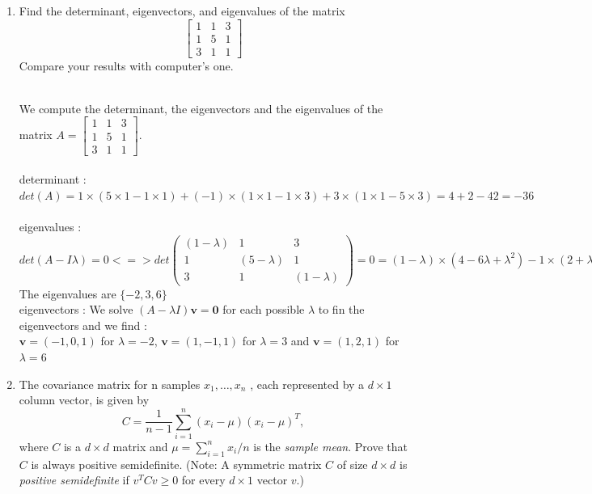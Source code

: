 \documentclass[a4paper]{article}
\begin{document}
\begin{enumerate}
    \item Find the determinant, eigenvectors, and eigenvalues of the matrix
    \[
    \begin{bmatrix}
        1 & 1 & 3 \\
        1 & 5 & 1 \\
        3 & 1 & 1
    \end{bmatrix}
    \]
    Compare your results with computer’s one.
    
    \hrulefill \\
    We compute the determinant, the eigenvectors and the eigenvalues of the matrix $A=\begin{bmatrix}
    1 & 1 & 3 \\ 
    1 & 5 & 1 \\ 
    3 & 1 & 1
    \end{bmatrix} $. \\
    \\
    determinant : $det(A)=1\times(5\times1-1\times1)+(-1)\times(1\times1-1\times3)+3\times(1\times1-5\times3) =4+2-42=-36$     \\
    \\
    eigenvalues : $det(A - I\lambda)= 0 <=> det\left( \begin{matrix} (1 - \lambda) & 1 & 3 \\ 1 & (5 - \lambda) & 1 \\ 3 &     1 & (1 - \lambda) \end{matrix} \right) = 0= (1 - \lambda) \times (4 - 6\lambda + \lambda^{2}) - 1 \times (2 + \lambda)     + 3 \times (1 - 15 + 3\lambda) = -36 + 7\lambda^{2} - \lambda^{3} = -(\lambda + 2)(\lambda - 3)(\lambda - 6)$\\
    The eigenvalues are $\{-2, 3, 6\}$\\
    eigenvectors : We solve $(A-\lambda I)\mathbf{v}=\mathbf{0}$ for each possible $\lambda$ to fin the eigenvectors and     we find :\\
    $\mathbf{v}=(-1,0,1)$ for $\lambda =-2$, $\mathbf{v}=(1,-1,1)$ for $\lambda =3$ and $\mathbf{v}=(1,2,1)$ for $\lambda     =6$

    
    \item The covariance matrix for n samples $x_1, \dots, x_n$ , each represented by a $d \times 1$ column vector, is given by
    \[
    C = \frac{1}{n - 1} \sum^n_{i=1} (x_i - \mu)(x_i - \mu)^T,
    \]
    where $C$ is a $d \times d$ matrix and $\mu = \sum^n_{i=1} x_i/n$ is the \textit{sample mean}.
    Prove that $C$ is always positive semidefinite. (Note: A symmetric matrix $C$ of size $d \times d$ is \textit{positive semidefinite} if $v^T C v \geq 0$ for every $d \times 1$ vector $v$.)
    

\end{enumerate}
\end{document}
